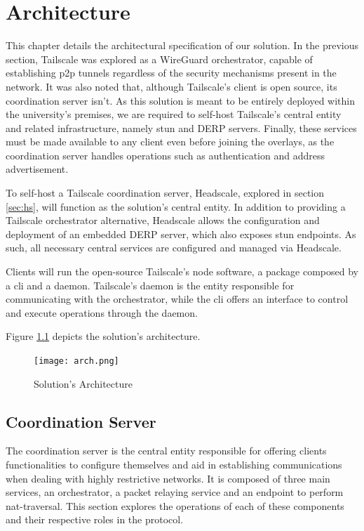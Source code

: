 \documentclass[11pt,twoside,a4paper]{report}
\begin{document}
\chapter{Architecture}

This chapter details the architectural specification of our solution. In the previous section, Tailscale was explored as a WireGuard orchestrator, capable of establishing \ac{p2p} tunnels regardless of the security mechanisms present in the network. It was also noted that, although Tailscale's client is open source, its coordination server isn't. As this solution is meant to be entirely deployed within the university's premises, we are required to self-host Tailscale's central entity and related infrastructure, namely \ac{stun} and \ac{DERP} servers. Finally, these services must be made available to any client even before joining the overlays, as the coordination server handles operations such as authentication and address advertisement.

To self-host a Tailscale coordination server, Headscale, explored in section \ref{sec:hs}, will function as the solution's central entity. In addition to providing a Tailscale orchestrator alternative, Headscale allows the configuration and deployment of an embedded \ac{DERP} server, which also exposes \ac{stun} endpoints. As such, all necessary central services are configured and managed via Headscale.

Clients will run the open-source Tailscale's node software, a package composed by a \ac{cli} and a daemon. Tailscale's daemon is the entity responsible for communicating with the orchestrator, while the \ac{cli} offers an interface to control and execute operations through the daemon.

Figure \ref{fig:arch} depicts the solution's architecture.

\begin{figure}[h]
\centering
\texttt{[image: arch.png]}
\caption{Solution's Architecture}
\label{fig:arch}
\end{figure}

\section{Coordination Server}

The coordination server is the central entity responsible for offering clients functionalities to configure themselves and aid in establishing communications when dealing with highly restrictive networks. It is composed of three main services, an orchestrator, a packet relaying service and an endpoint to perform \ac{nat}-traversal. This section explores the operations of each of these components and their respective roles in the protocol.
\end{document}
